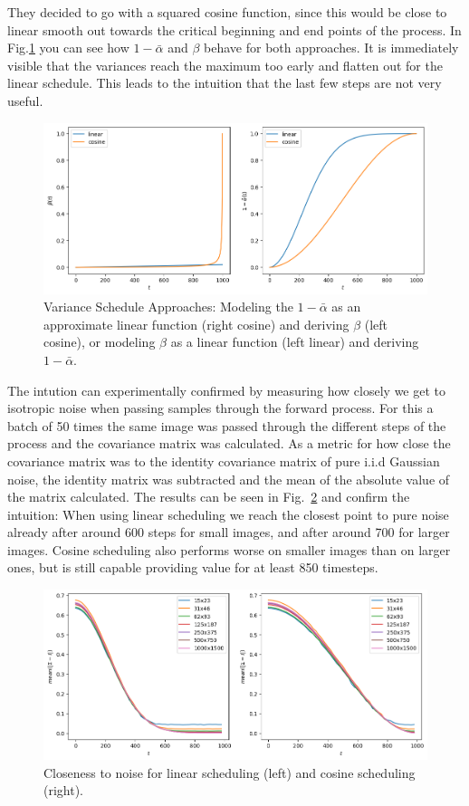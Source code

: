 They decided to go with a squared cosine function, since this would be close to linear smooth out towards the critical beginning and end points of the process. In Fig.\ref{fig:alphadash} you can see how $1-\bar{\alpha}$ and $\beta$ behave for both approaches. It is immediately visible that the variances reach the maximum too early and flatten out for the linear schedule. This leads to the intuition that the last few steps are not very useful.

\begin{figure}[h]
    \centering
    \includegraphics[width=.5\textwidth]{images/variance_schedule_alphadash.png}
    \caption{Variance Schedule Approaches: Modeling the $1-\bar{\alpha}$ as an approximate linear function (right cosine) and deriving $\beta$ (left cosine), or modeling $\beta$ as a linear function (left linear) and deriving $1-\bar{\alpha}$.}
    \label{fig:alphadash}
\end{figure}

The intution can experimentally confirmed by measuring how closely we get to isotropic noise when passing samples through the forward process. For this a batch of 50 times the same image was passed through the different steps of the process and the covariance matrix was calculated. As a metric for how close the covariance matrix was to the identity covariance matrix of pure i.i.d Gaussian noise, the identity matrix was subtracted and the mean of the absolute value of the matrix calculated. The results can be seen in Fig.~\ref{fig:noisecloseness} and confirm the intuition: When using linear scheduling we reach the closest point to pure noise already after around 600 steps for small images, and after around 700 for larger images. Cosine scheduling also performs worse on smaller images than on larger ones, but is still capable providing value for at least 850 timesteps.

\begin{figure}[h]
    \centering
    \includegraphics[width=.5\textwidth]{images/frobenius_norm.png}
    \caption{Closeness to noise for linear scheduling (left) and cosine scheduling (right).}
    \label{fig:noisecloseness}
\end{figure}

